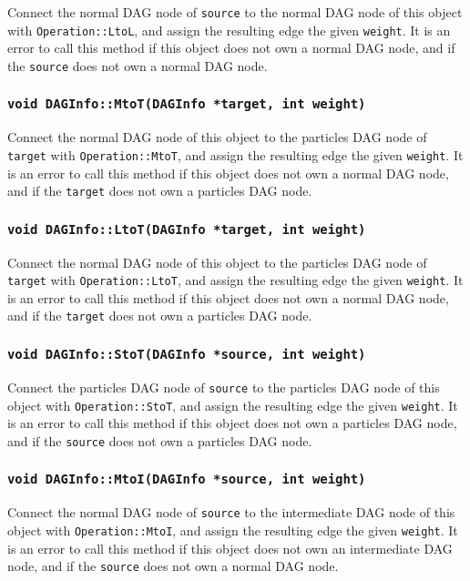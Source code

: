 Connect the normal DAG node of \texttt{source} to the normal DAG node of
this object with \texttt{Operation::LtoL}, and assign the resulting edge the
given \texttt{weight}. It is an error to call this method if this object does
not own a normal DAG node, and if the \texttt{source} does not own a normal
DAG node.

\subsubsection{\texttt{void DAGInfo::MtoT(DAGInfo *target, int weight)}}

Connect the normal DAG node of this object to the particles DAG node of
\texttt{target} with \texttt{Operation::MtoT}, and assign the resulting edge
the given \texttt{weight}. It is an error to call this method if this object
does not own a normal DAG node, and if the \texttt{target} does not own a
particles DAG node.

\subsubsection{\texttt{void DAGInfo::LtoT(DAGInfo *target, int weight)}}

Connect the normal DAG node of this object to the particles DAG node of
\texttt{target} with \texttt{Operation::LtoT}, and assign the resulting edge
the given \texttt{weight}. It is an error to call this method if this object
does not own a normal DAG node, and if the \texttt{target} does not own a
particles DAG node.

\subsubsection{\texttt{void DAGInfo::StoT(DAGInfo *source, int weight)}}

Connect the particles DAG node of \texttt{source} to the particles DAG node of
this object with \texttt{Operation::StoT}, and assign the resulting edge the
given \texttt{weight}. It is an error to call this method if this object does
not own a particles DAG node, and if the \texttt{source} does not own a
particles DAG node.

\subsubsection{\texttt{void DAGInfo::MtoI(DAGInfo *source, int weight)}}

Connect the normal DAG node of \texttt{source} to the intermediate DAG node of
this object with \texttt{Operation::MtoI}, and assign the resulting edge the
given \texttt{weight}. It is an error to call this method if this object does
not own an intermediate DAG node, and if the \texttt{source} does not own a
normal DAG node.

